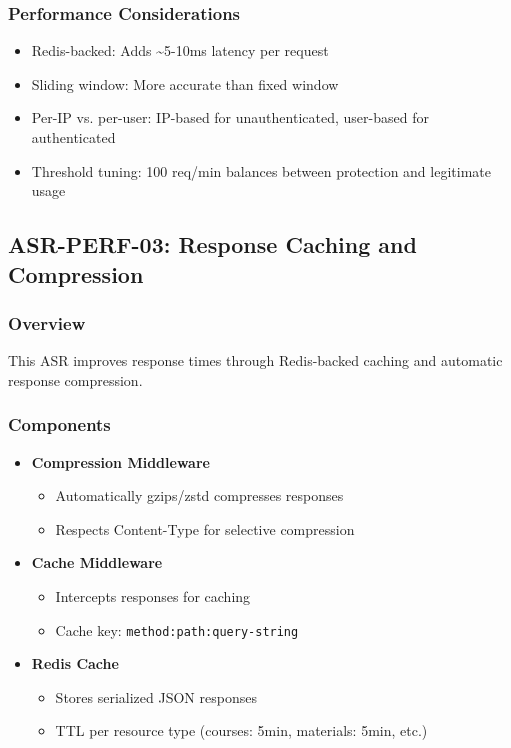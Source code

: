\documentclass[12pt,oneside,a4paper]{article}
\begin{document}
\subsubsection{Performance Considerations}
\begin{itemize}
    \item Redis-backed: Adds \textasciitilde 5-10ms latency per request
    \item Sliding window: More accurate than fixed window
    \item Per-IP vs. per-user: IP-based for unauthenticated, user-based for authenticated
    \item Threshold tuning: 100 req/min balances between protection and legitimate usage
\end{itemize}

\subsection{ASR-PERF-03: Response Caching and Compression}

\subsubsection{Overview}
This ASR improves response times through Redis-backed caching and automatic response compression.

\subsubsection{Components}
\begin{itemize}
    \item \textbf{Compression Middleware}
        \begin{itemize}
            \item Automatically gzips/zstd compresses responses
            \item Respects Content-Type for selective compression
        \end{itemize}
    \item \textbf{Cache Middleware}
        \begin{itemize}
            \item Intercepts responses for caching
            \item Cache key: \texttt{method:path:query-string}
        \end{itemize}
    \item \textbf{Redis Cache}
        \begin{itemize}
            \item Stores serialized JSON responses
            \item TTL per resource type (courses: 5min, materials: 5min, etc.)
        \end{itemize}
\end{itemize}
\end{document}
